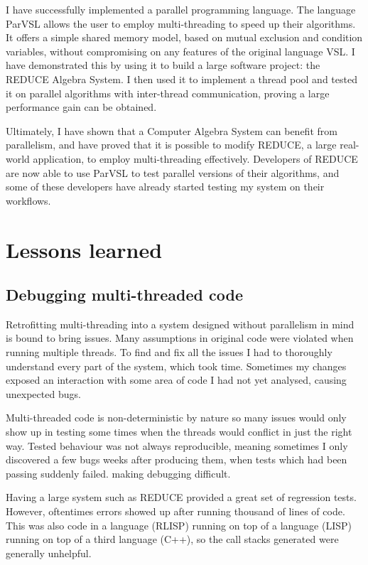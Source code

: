 I have successfully implemented a parallel programming language. The language ParVSL
allows the user to employ multi-threading to speed up their algorithms. It offers
a simple shared memory model, based on mutual exclusion and condition variables,
without compromising on any features of the original language VSL. I have demonstrated
this by using it to build a large software project: the REDUCE Algebra System.
I then used it to implement a thread pool and tested it on parallel algorithms with
inter-thread communication, proving a large performance gain can be obtained.

Ultimately, I have shown that a Computer Algebra System can benefit from parallelism,
and have proved that it is possible to modify REDUCE, a large real-world application,
to employ multi-threading effectively. Developers of REDUCE are now able to
use ParVSL to test parallel versions of their algorithms, and some of these developers
have already started testing my system on their workflows.

\section{Lessons learned}

\subsection{Debugging multi-threaded code}

Retrofitting multi-threading into a system designed without parallelism in mind is bound to bring issues.
Many assumptions in original code were violated when running multiple threads. To find and fix all the issues
I had to thoroughly understand every part of the system, which took time.
Sometimes my changes exposed an interaction with some area of code
I had not yet analysed, causing unexpected bugs.

Multi-threaded code is non-deterministic
by nature so many issues would only show up in testing some times when the threads would conflict in just the
right way. Tested behaviour was not always reproducible,
meaning sometimes I only discovered a few bugs weeks after producing them,
when tests which had been passing suddenly failed. making debugging difficult.

Having a large system such as REDUCE provided a great set of regression
tests. However, oftentimes errors showed up after running thousand of lines
of code. This was also code in a language (RLISP) running on top
of a language (LISP) running on top of a third language (C++), so the call stacks
generated were generally unhelpful.

